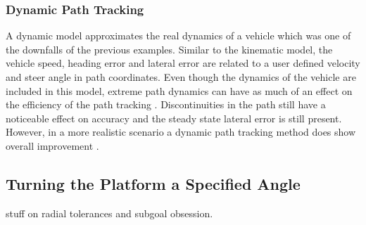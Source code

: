 \documentclass[main.tex]{subfiles}
\begin{document}
\subsubsection{Dynamic Path Tracking}
A dynamic model approximates the real dynamics of a vehicle which was one of the downfalls of the previous examples. Similar to the kinematic model, the vehicle speed, heading error and lateral error are related to a user defined velocity and steer angle in path coordinates. Even though the dynamics of the vehicle are included in this model, extreme path dynamics can have as much of an effect on the efficiency of the path tracking \parencite{snider2009}. Discontinuities in the path still have a noticeable effect on accuracy and the steady state lateral error is still present. However, in a more realistic scenario a dynamic path tracking method does show overall improvement \parencite{snider2009}.

\subsection{Turning the Platform a Specified Angle}
stuff on radial tolerances and subgoal obsession.
\end{document}
